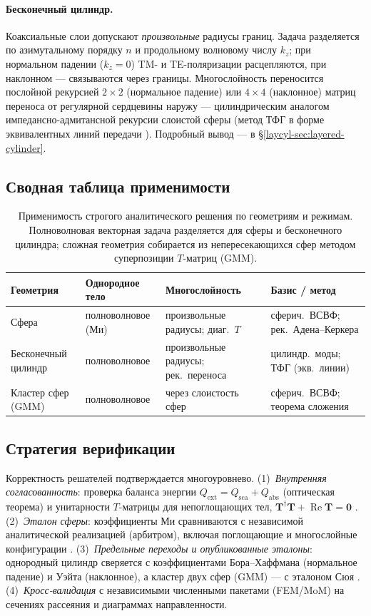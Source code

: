 \documentclass[11pt,a4paper]{article}
\begin{document}
\paragraph{Бесконечный цилиндр.} Коаксиальные слои допускают \emph{произвольные} радиусы границ. Задача разделяется по азимутальному порядку $n$ и продольному волновому числу $k_z$; при нормальном падении ($k_z=0$) TM- и TE-поляризации расцепляются, при наклонном --- связываются через границы. Многослойность переносится послойной рекурсией $2\times2$ (нормальное падение) или $4\times4$ (наклонное) матриц переноса от регулярной сердцевины наружу --- цилиндрическим аналогом импедансно-адмитансной рекурсии слоистой сферы (метод ТФГ в форме эквивалентных линий передачи \cite{daylis2017,mitelman2013}). Подробный вывод --- в \S\ref{laycyl-sec:layered-cylinder}.

\subsection{Сводная таблица применимости}

\begin{table}[ht]
\centering
\begin{tabular}{@{}llll@{}}
\toprule
Геометрия & Однородное тело & Многослойность & Базис / метод \\
\midrule
Сфера & полноволновое (Ми) & произвольные радиусы; диаг.\ $T$ & сферич.\ ВСВФ; рек.\ Адена--Керкера \\
Бесконечный цилиндр & полноволновое & произвольные радиусы; рек.\ переноса & цилиндр.\ моды; ТФГ (экв.\ линии) \\
Кластер сфер (GMM) & полноволновое & через слоистость сфер & сферич.\ ВСВФ; теорема сложения \\
\bottomrule
\end{tabular}
\caption{Применимость строгого аналитического решения по геометриям и режимам. Полноволновая векторная задача разделяется для сферы и бесконечного цилиндра; сложная геометрия собирается из непересекающихся сфер методом суперпозиции $T$-матриц (GMM).}
\label{plan-tab:feasibility}
\end{table}

\subsection{Стратегия верификации}

Корректность решателей подтверждается многоуровнево. (1)~\emph{Внутренняя согласованность}: проверка баланса энергии $Q_{\mathrm{ext}}=Q_{\mathrm{sca}}+Q_{\mathrm{abs}}$ (оптическая теорема) и унитарности $T$-матрицы для непоглощающих тел, $\bm{T}^{\dagger}\bm{T}+\operatorname{Re}\bm{T}=\bm{0}$ \cite{waterman1971,mishchenko2002}. (2)~\emph{Эталон сферы}: коэффициенты Ми сравниваются с независимой аналитической реализацией (арбитром), включая поглощающие и многослойные конфигурации \cite{bohren1983}. (3)~\emph{Предельные переходы и опубликованные эталоны}: однородный цилиндр сверяется с коэффициентами Бора--Хаффмана (нормальное падение) и Уэйта (наклонное), а кластер двух сфер (GMM) --- с эталоном Сюя \cite{bohren1983,wait1955,xu1995}. (4)~\emph{Кросс-валидация} с независимыми численными пакетами (FEM/MoM) на сечениях рассеяния и диаграммах направленности.
\end{document}
